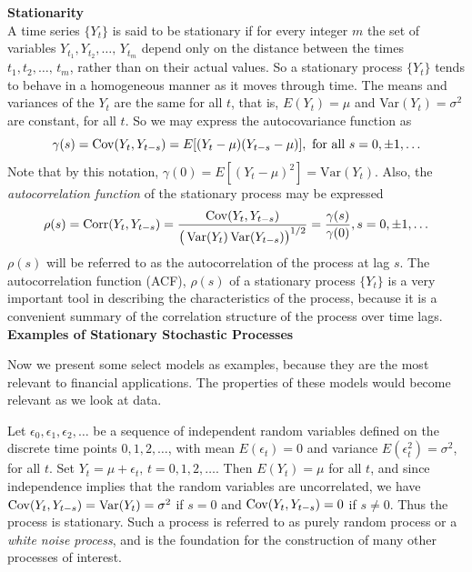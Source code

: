 \noindent \textbf{Stationarity} \\


A time series $\{Y_t\}$ is said to be stationary if for every integer $m$ the set of variables $Y_{t_1}, Y_{t_2}, \ldots, \, Y_{t_m}$ depend only on the distance between the times $t_1, t_2, \ldots, \, t_m$, rather than on their actual values.  So a stationary process $\{Y_t\}$ tends to behave in a homogeneous manner as it moves through time. The means and variances of the $Y_t$ are the same for all $t$, that is, $E\left(Y_t\right) = \mu$ and  Var$\left(Y_t\right)=\sigma^2$ are constant, for all $t$. So we may express the autocovariance function as 
	\begin{equation}\label{eqn:2gammas}
	\gamma(s)=\Cov(Y_t,Y_{t - s})=E[(Y_t-\mu)(Y_{t - s}-\mu)], \text{ for all }s=0,\pm 1, \ldots
	\end{equation}
Note that by this notation, $\gamma(0) = E[(Y_t-\mu)^2] = \text{Var}(Y_t)$. Also, the \textit{autocorrelation function} of the stationary process may be expressed
        	\begin{equation}\label{eqn:2rhos}
	\rho(s)=\Corr(Y_t,Y_{t-s})= \dfrac{\Cov(Y_t,Y_{t-s})}{\big(\Var(Y_t)\Var(Y_{t-s})\big)^{1/2}} = \dfrac{\gamma(s)}{\gamma(0)},  s=0,\pm 1,\ldots
	\end{equation}
$\rho(s)$ will be referred to as the autocorrelation of the process at lag $s$. The autocorrelation function (ACF), $\rho(s)$ of a stationary process $\{Y_t\}$ is a very important tool in describing the characteristics of the process, because it is a convenient summary of the correlation structure of the process over time lags.  \\


\noindent \textbf{Examples of Stationary Stochastic Processes} 


Now we present some select models as examples, because they are the most relevant to financial applications. The properties of these models would become relevant as we look at data. 


\begin{ex} \label{ex:whitenoise} Let $\epsilon_0, \epsilon_1,\epsilon_2, \ldots$ be a sequence of independent random variables defined on the discrete time points $0,1,2,\ldots$, with mean $E(\epsilon_{t})=0$ and variance $E(\epsilon_{t}^2)=\sigma^2$, for all $t$. Set $Y_t = \mu + \epsilon_t, \, t=0, 1, 2, \ldots$. Then $E(Y_t)=\mu$ for all $t$, and since independence implies that the random variables are uncorrelated, we have $\operatorname{Cov}(Y_t,Y_{t-s})=\operatorname{Var}(Y_t)=\sigma^2$ if $s=0$ and $\operatorname{Cov}(Y_t,Y_{t-s})=0$ if $s\neq 0$. Thus the process is stationary. Such a process is referred to as purely random process or a \textit{white noise process}, and is the foundation for the construction of many other processes of interest. 
\end{ex}



